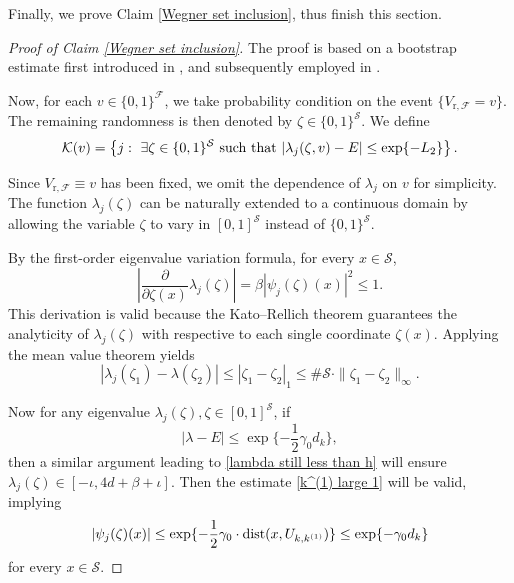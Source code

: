 \documentclass[11pt,reqno,UTF8,twoside]{amsart}
\newcommand{\mcF}{\mathcal{F}}
\newcommand{\mcS}{\mathcal{S}}
\newcommand{\mcK}{\mathcal{K}}
\newcommand{\dist}{{\rm dist}}
\theoremstyle{definition}
\numberwithin{equation}{section}
\begin{document}
Finally, we prove Claim \ref{Wegner set inclusion}, thus  finish this section.
\begin{proof}[Proof of Claim \ref{Wegner set inclusion}]
The proof is based on a bootstrap estimate first introduced in \cite{Bou04}, and subsequently employed in \cite{BK05,DS20,LZ22,Li22,LSZ25}.
 
Now, for each $v\in \{0,1\}^{\mcF}$, we take probability condition on the event $\{V_{\text{r},\mcF}=v\}$. The remaining randomness is then denoted by $\zeta \in \{0,1\}^{\mcS}$. We define  
 \begin{equation}\label{mcK}
    \mcK(v)=\left\{ j:\  \exists \zeta \in \{0,1\}^{\mcS} \ {\rm such\ that} \ |\lambda_j(\zeta,v)-E|\leq \exp\{-L_2 \}       \right\}.
  \end{equation}
  
Since $V_{\text{r},\mcF}\equiv v$ has been fixed, we omit the dependence of $\lambda_j$ on $v$ for  simplicity. The function $\lambda_j(\zeta)$ can be naturally extended to a continuous domain by allowing the variable $\zeta$ to vary in $[0,1]^{\mcS}$ instead of $\{0,1\}^{\mcS}$. 

By the first-order eigenvalue variation formula, for every $x\in \mcS$,
\begin{equation}\label{first derivation 1}
  \left|\frac{\partial}{\partial \zeta (x)} \lambda_j(\zeta)\right|=\beta |\psi_j(\zeta)(x)|^2 \leq 1.
\end{equation}
This derivation is valid because the Kato–Rellich theorem guarantees the analyticity of $\lambda_j(\zeta)$ with respective to each single coordinate $\zeta(x)$. Applying the mean value theorem yields 
\begin{equation}\label{mean value theorem}
  \left|   \lambda_j(\zeta_1)-\lambda(\zeta_2)  \right| \leq |\zeta_1-\zeta_2|_1 \leq \#\mcS \cdot \|\zeta_1-\zeta_2\|_{\infty}.
\end{equation}
 

Now for any eigenvalue $\lambda_j(\zeta),\zeta\in [0,1]^{\mcS}$, if  
\begin{equation}\label{loose bound}
  |\lambda-E|\leq \exp\{-\frac{1}{2}\gamma_0 d_k\},
\end{equation}
then a similar argument  leading to \eqref{lambda still less than h} will ensure $\lambda_j(\zeta)\in [-\iota,4d+\beta+\iota]$. Then the estimate \eqref{k^(1) large 1} will be valid, implying
\begin{equation}\label{faster derivation decay}
  |\psi_j(\zeta)(x)|   \leq \exp\{-\frac{1}{2}\gamma_0 \cdot \dist(x,U_{k,k^{(1)}})\}\leq \exp\{-\gamma_0 d_k\}
\end{equation}
for every $x\in \mcS$. 


\end{proof}
\end{document}
